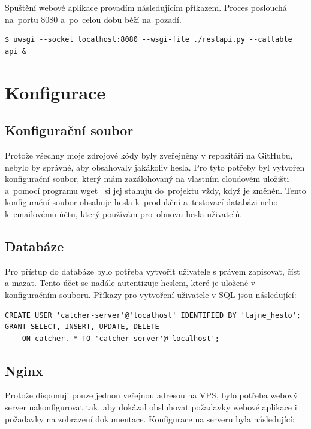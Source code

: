 Spuštění webové aplikace provadím následujícím příkazem. Proces poslouchá na~portu 8080 a~po~celou dobu běží na~pozadí.

\begingroup
\fontsize{9.5pt}{11pt}\selectfont
\begin{verbatim}
$ uwsgi --socket localhost:8080 --wsgi-file ./restapi.py --callable api &
\end{verbatim}
\endgroup

\section{Konfigurace}

\subsection*{Konfigurační soubor}

Protože všechny moje zdrojové kódy byly zveřejněny v repozitáři na GitHubu, nebylo by správné, aby obsahovaly jakákoliv hesla.
Pro tyto potřeby byl vytvořen konfigurační soubor, který mám zazálohovaný na vlastním cloudovém uložišti
a~pomocí programu wget~\cite{wget} si jej stahuju do~projektu vždy, když je změněn.
Tento konfigurační soubor obsahuje hesla k~produkční a~testovací databázi
nebo k~emailovému účtu, který používám pro~obnovu hesla uživatelů.

\subsection*{Databáze}

Pro přístup do databáze bylo potřeba vytvořit uživatele s právem zapisovat, číst a mazat.
Tento účet se nadále autentizuje heslem, které je uložené v konfiguračním souboru.
Příkazy pro vytvoření uživatele v SQL jsou následující:

\begingroup
\fontsize{9.5pt}{11pt}\selectfont
\begin{verbatim}
CREATE USER 'catcher-server'@'localhost' IDENTIFIED BY 'tajne_heslo';
GRANT SELECT, INSERT, UPDATE, DELETE
    ON catcher. * TO 'catcher-server'@'localhost';
\end{verbatim}
\endgroup

\subsection*{Nginx}

Protože disponuji pouze jednou veřejnou adresou na VPS, bylo potřeba webový server nakonfigurovat tak,
aby dokázal obsluhovat požadavky webové aplikace i požadavky
na zobrazení dokumentace. Konfigurace na serveru byla následující:

